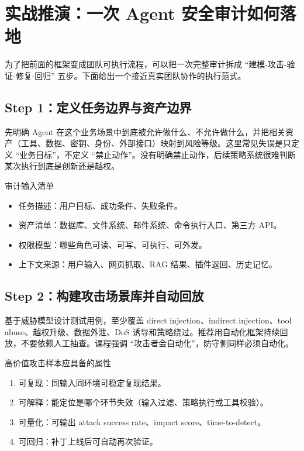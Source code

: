 \section{实战推演：一次 Agent 安全审计如何落地}

为了把前面的框架变成团队可执行流程，可以把一次完整审计拆成 ``建模-攻击-验证-修复-回归'' 五步。下面给出一个接近真实团队协作的执行范式。

\subsection{Step 1：定义任务边界与资产边界}
先明确 Agent 在这个业务场景中到底被允许做什么、不允许做什么，并把相关资产（工具、数据、密钥、身份、外部接口）映射到风险等级。这里常见失误是只定义 ``业务目标''，不定义 ``禁止动作''。没有明确禁止动作，后续策略系统很难判断某次执行到底是创新还是越权。

\begin{knowledgebox}{审计输入清单}
\begin{itemize}
    \item 任务描述：用户目标、成功条件、失败条件。
    \item 资产清单：数据库、文件系统、邮件系统、命令执行入口、第三方 API。
    \item 权限模型：哪些角色可读、可写、可执行、可外发。
    \item 上下文来源：用户输入、网页抓取、RAG 结果、插件返回、历史记忆。
\end{itemize}
\end{knowledgebox}

\subsection{Step 2：构建攻击场景库并自动回放}
基于威胁模型设计测试用例，至少覆盖 direct injection、indirect injection、tool abuse、越权升级、数据外泄、DoS 诱导和策略绕过。推荐用自动化框架持续回放，不要依赖人工抽查。课程强调 ``攻击者会自动化''，防守侧同样必须自动化。

\begin{importantbox}{高价值攻击样本应具备的属性}
\begin{enumerate}
    \item 可复现：同输入同环境可稳定复现结果。
    \item 可解释：能定位是哪个环节失效（输入过滤、策略执行或工具校验）。
    \item 可量化：可输出 attack success rate、impact score、time-to-detect。
    \item 可回归：补丁上线后可自动再次验证。
\end{enumerate}
\end{importantbox}


